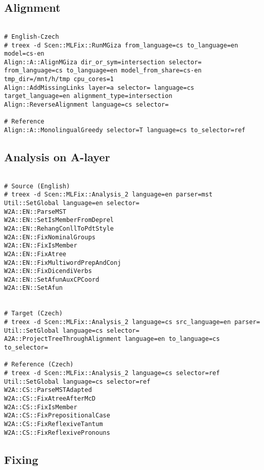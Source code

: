 \subsection{Alignment}

\begin{lstlisting}

# English-Czech
# treex -d Scen::MLFix::RunMGiza from_language=cs to_language=en model=cs-en
Align::A::AlignMGiza dir_or_sym=intersection selector= from_language=cs to_language=en model_from_share=cs-en tmp_dir=/mnt/h/tmp cpu_cores=1
Align::AddMissingLinks layer=a selector= language=cs target_language=en alignment_type=intersection
Align::ReverseAlignment language=cs selector=

# Reference
Align::A::MonolingualGreedy selector=T language=cs to_selector=ref

\end{lstlisting}

\subsection{Analysis on A-layer}

\begin{lstlisting}

# Source (English)
# treex -d Scen::MLFix::Analysis_2 language=en parser=mst
Util::SetGlobal language=en selector=
W2A::EN::ParseMST
W2A::EN::SetIsMemberFromDeprel
W2A::EN::RehangConllToPdtStyle
W2A::EN::FixNominalGroups
W2A::EN::FixIsMember
W2A::EN::FixAtree
W2A::EN::FixMultiwordPrepAndConj
W2A::EN::FixDicendiVerbs
W2A::EN::SetAfunAuxCPCoord
W2A::EN::SetAfun


# Target (Czech)
# treex -d Scen::MLFix::Analysis_2 language=cs src_language=en parser=
Util::SetGlobal language=cs selector=
A2A::ProjectTreeThroughAlignment language=en to_language=cs to_selector=

# Reference (Czech)
# treex -d Scen::MLFix::Analysis_2 language=cs selector=ref
Util::SetGlobal language=cs selector=ref
W2A::CS::ParseMSTAdapted
W2A::CS::FixAtreeAfterMcD
W2A::CS::FixIsMember
W2A::CS::FixPrepositionalCase
W2A::CS::FixReflexiveTantum
W2A::CS::FixReflexivePronouns

\end{lstlisting}

\subsection{Fixing}

